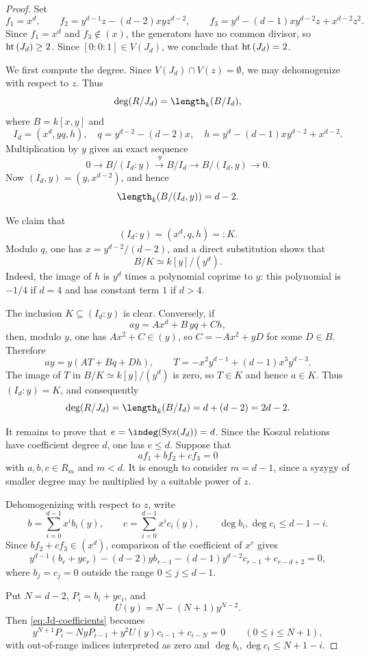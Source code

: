 \documentclass[11pt]{amsart} %
\theoremstyle{definition}
\def\hht{{\rm ht}\,}
\def\syz{\mbox{\rm Syz}}
\def\hht{{\rm ht}\,}
\begin{document}
\begin{proof}
Set
\[
f_1=x^d,\qquad
f_2=y^{d-1}z-(d-2)xyz^{d-2},\qquad
f_3=y^d-(d-1)xy^{d-2}z+x^{d-2}z^2.
\]
Since $f_1=x^d$ and $f_3\notin(x)$, the generators have no common
divisor, so $\hht(J_d)\ge2$. Since $[0:0:1]\in V(J_d)$, we conclude
that $\hht(J_d)=2$.

We first compute the degree. Since $V(J_d)\cap V(z)=\emptyset$, we may
dehomogenize with respect to $z$. Thus
\[
\deg(R/J_d)=\length_k(B/I_d),
\]
where $B=k[x,y]$ and
\[
I_d=(x^d,yq,h),
\quad
q=y^{d-2}-(d-2)x,
\quad
h=y^d-(d-1)xy^{d-2}+x^{d-2}.
\]
Multiplication by $y$ gives an exact sequence
\[
0\to B/(I_d:y)\xrightarrow{\cdot y}B/I_d\to B/(I_d,y)\to0.
\]
Now $(I_d,y)=(y,x^{d-2})$, and hence
\[
\length_k(B/(I_d,y))=d-2.
\]

We claim that
\[
(I_d:y)=(x^d,q,h)=:K.
\]
Modulo $q$, one has $x=y^{d-2}/(d-2)$, and a direct substitution shows
that
\[
B/K\simeq k[y]/(y^d).
\]
Indeed, the image of $h$ is $y^d$ times a polynomial coprime to $y$:
this polynomial is $-1/4$ if $d=4$ and has constant term $1$ if $d>4$.

The inclusion $K\subseteq(I_d:y)$ is clear. Conversely, if
\[
ay=Ax^d+B\,yq+Ch,
\]
then, modulo $y$, one has $Ax^2+C\in(y)$, so $C=-Ax^2+yD$ for some
$D\in B$. Therefore
\[
ay=y(AT+Bq+Dh),
\qquad
T=-x^2y^{d-1}+(d-1)x^3y^{d-3}.
\]
The image of $T$ in $B/K\simeq k[y]/(y^d)$ is zero, so $T\in K$ and
hence $a\in K$. Thus $(I_d:y)=K$, and consequently
\[
\deg(R/J_d)
=\length_k(B/I_d)
=d+(d-2)=2d-2.
\]

It remains to prove that $e=\indeg(\syz(J_d))=d$. Since the Koszul
relations have coefficient degree $d$, one has $e\le d$. Suppose that
\[
af_1+bf_2+cf_3=0
\]
with $a,b,c\in R_m$ and $m<d$. It is enough to consider $m=d-1$, since
a syzygy of smaller degree may be multiplied by a suitable power of
$z$.

Dehomogenizing with respect to $z$, write
\[
b=\sum_{i=0}^{d-1}x^ib_i(y),
\qquad
c=\sum_{i=0}^{d-1}x^ic_i(y),
\qquad
\deg b_i,\deg c_i\le d-1-i.
\]
Since $bf_2+cf_3\in(x^d)$, comparison of the coefficient of $x^r$ gives
\begin{equation}\label{eq:Jd-coefficients}
y^{d-1}(b_r+yc_r)
-(d-2)yb_{r-1}
-(d-1)y^{d-2}c_{r-1}
+c_{r-d+2}=0,
\end{equation}
where $b_j=c_j=0$ outside the range $0\le j\le d-1$.

Put $N=d-2$, $P_i=b_i+yc_i$, and
\[
U(y)=N-(N+1)y^{N-2}.
\]
Then \eqref{eq:Jd-coefficients} becomes
\begin{equation}\label{eq:Jd-recursion-expanded}
y^{N+1}P_i-NyP_{i-1}+y^2U(y)c_{i-1}+c_{i-N}=0
\qquad(0\le i\le N+1),
\end{equation}
with out-of-range indices interpreted as zero and
$\deg b_i,\deg c_i\le N+1-i$.


\end{proof}
\end{document}
